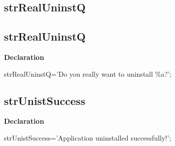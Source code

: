\documentclass{report}
\newif\ifpdf
\begin{document}
\subsection*{\large{\textbf{strRealUninstQ}}\normalsize\hspace{1ex}\hrulefill}
\else
\subsection*{strRealUninstQ}
\fi
\label{trstrings-strRealUninstQ}
\begin{list}{}{
\setlength{\itemindent}{0cm}
\setlength{\listparindent}{0cm}
\setlength{\leftmargin}{\evensidemargin}
\addtolength{\leftmargin}{\tmplength}
\settowidth{\labelsep}{X}
\addtolength{\leftmargin}{\labelsep}
\setlength{\labelwidth}{\tmplength}
}
\item[\textbf{Declaration}\hfill]
\ifpdf
\begin{flushleft}
\fi
\begin{ttfamily}
strRealUninstQ='Do you really want to uninstall {\%}a?';\end{ttfamily}

\ifpdf
\end{flushleft}
\fi

\end{list}
\ifpdf
\subsection*{\large{\textbf{strUnistSuccess}}\normalsize\hspace{1ex}\hrulefill}
\else
\subsection*{strUnistSuccess}
\fi
\label{trstrings-strUnistSuccess}
\begin{list}{}{
\setlength{\itemindent}{0cm}
\setlength{\listparindent}{0cm}
\setlength{\leftmargin}{\evensidemargin}
\addtolength{\leftmargin}{\tmplength}
\settowidth{\labelsep}{X}
\addtolength{\leftmargin}{\labelsep}
\setlength{\labelwidth}{\tmplength}
}
\item[\textbf{Declaration}\hfill]
\ifpdf
\begin{flushleft}
\fi
\begin{ttfamily}
strUnistSuccess='Application uninstalled successfully!';\end{ttfamily}

\ifpdf
\end{flushleft}
\fi

\end{list}
\ifpdf
\end{document}
